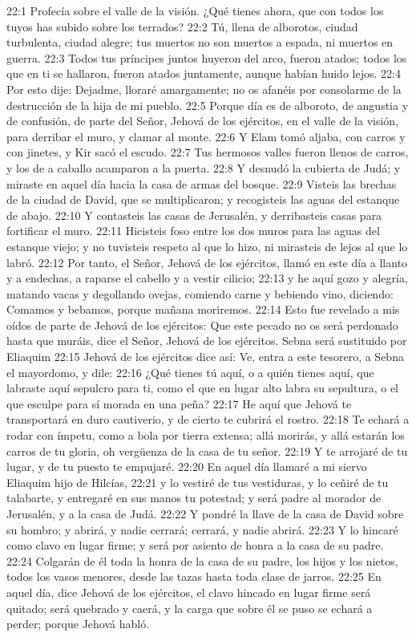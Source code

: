 22:1 Profecía sobre el valle de la visión. ¿Qué tienes ahora, que con todos los tuyos has subido sobre los terrados? 
22:2 Tú, llena de alborotos, ciudad turbulenta, ciudad alegre; tus muertos no son muertos a espada, ni muertos en guerra. 
22:3 Todos tus príncipes juntos huyeron del arco, fueron atados; todos los que en ti se hallaron, fueron atados juntamente, aunque habían huido lejos. 
22:4 Por esto dije: Dejadme, lloraré amargamente; no os afanéis por consolarme de la destrucción de la hija de mi pueblo. 
22:5 Porque día es de alboroto, de angustia y de confusión, de parte del Señor, Jehová de los ejércitos, en el valle de la visión, para derribar el muro, y clamar al monte. 
22:6 Y Elam tomó aljaba, con carros y con jinetes, y Kir sacó el escudo. 
22:7 Tus hermosos valles fueron llenos de carros, y los de a caballo acamparon a la puerta. 
22:8 Y desnudó la cubierta de Judá; y miraste en aquel día hacia la casa de armas del bosque. 
22:9 Visteis las brechas de la ciudad de David, que se multiplicaron; y recogisteis las aguas del estanque de abajo. 
22:10 Y contasteis las casas de Jerusalén, y derribasteis casas para fortificar el muro. 
22:11 Hicisteis foso entre los dos muros para las aguas del estanque viejo; y no tuvisteis respeto al que lo hizo, ni mirasteis de lejos al que lo labró. 
22:12 Por tanto, el Señor, Jehová de los ejércitos, llamó en este día a llanto y a endechas, a raparse el cabello y a vestir cilicio; 
22:13 y he aquí gozo y alegría, matando vacas y degollando ovejas, comiendo carne y bebiendo vino, diciendo: Comamos y bebamos, porque mañana moriremos. 
22:14 Esto fue revelado a mis oídos de parte de Jehová de los ejércitos: Que este pecado no os será perdonado hasta que muráis, dice el Señor, Jehová de los ejércitos. 
Sebna será sustituido por Eliaquim 
22:15 Jehová de los ejércitos dice así: Ve, entra a este tesorero, a Sebna el mayordomo, y dile: 
22:16 ¿Qué tienes tú aquí, o a quién tienes aquí, que labraste aquí sepulcro para ti, como el que en lugar alto labra su sepultura, o el que esculpe para sí morada en una peña? 
22:17 He aquí que Jehová te transportará en duro cautiverio, y de cierto te cubrirá el rostro. 
22:18 Te echará a rodar con ímpetu, como a bola por tierra extensa; allá morirás, y allá estarán los carros de tu gloria, oh vergüenza de la casa de tu señor. 
22:19 Y te arrojaré de tu lugar, y de tu puesto te empujaré. 
22:20 En aquel día llamaré a mi siervo Eliaquim hijo de Hilcías, 
22:21 y lo vestiré de tus vestiduras, y lo ceñiré de tu talabarte, y entregaré en sus manos tu potestad; y será padre al morador de Jerusalén, y a la casa de Judá. 
22:22 Y pondré la llave de la casa de David sobre su hombro; y abrirá, y nadie cerrará; cerrará, y nadie abrirá. 
22:23 Y lo hincaré como clavo en lugar firme; y será por asiento de honra a la casa de su padre. 
22:24 Colgarán de él toda la honra de la casa de su padre, los hijos y los nietos, todos los vasos menores, desde las tazas hasta toda clase de jarros. 
22:25 En aquel día, dice Jehová de los ejércitos, el clavo hincado en lugar firme será quitado; será quebrado y caerá, y la carga que sobre él se puso se echará a perder; porque Jehová habló. 
